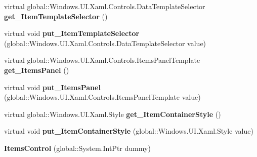\begin{DoxyCompactItemize}
\item 
\mbox{\label{class_windows_1_1_u_i_1_1_xaml_1_1_controls_1_1_items_control_a9959b8e62f370e00b7c5ba03c1735a6c}} 
virtual global\+::\+Windows.\+U\+I.\+Xaml.\+Controls.\+Data\+Template\+Selector {\bfseries get\+\_\+\+Item\+Template\+Selector} ()
\item 
\mbox{\label{class_windows_1_1_u_i_1_1_xaml_1_1_controls_1_1_items_control_aa9c0c0db76f9d77b78c08b022e500e90}} 
virtual void {\bfseries put\+\_\+\+Item\+Template\+Selector} (global\+::\+Windows.\+U\+I.\+Xaml.\+Controls.\+Data\+Template\+Selector value)
\item 
\mbox{\label{class_windows_1_1_u_i_1_1_xaml_1_1_controls_1_1_items_control_a54332e55a6fbe6987c21c07fe342a9e2}} 
virtual global\+::\+Windows.\+U\+I.\+Xaml.\+Controls.\+Items\+Panel\+Template {\bfseries get\+\_\+\+Items\+Panel} ()
\item 
\mbox{\label{class_windows_1_1_u_i_1_1_xaml_1_1_controls_1_1_items_control_affd7b155eec7e46ac2c935a6634d6d21}} 
virtual void {\bfseries put\+\_\+\+Items\+Panel} (global\+::\+Windows.\+U\+I.\+Xaml.\+Controls.\+Items\+Panel\+Template value)
\item 
\mbox{\label{class_windows_1_1_u_i_1_1_xaml_1_1_controls_1_1_items_control_ac8ecf557d2e90d25785dc40f5d1e3069}} 
virtual global\+::\+Windows.\+U\+I.\+Xaml.\+Style {\bfseries get\+\_\+\+Item\+Container\+Style} ()
\item 
\mbox{\label{class_windows_1_1_u_i_1_1_xaml_1_1_controls_1_1_items_control_a22e6b11c11e2306e3c13c1294b698d47}} 
virtual void {\bfseries put\+\_\+\+Item\+Container\+Style} (global\+::\+Windows.\+U\+I.\+Xaml.\+Style value)
\item 
\mbox{\label{class_windows_1_1_u_i_1_1_xaml_1_1_controls_1_1_items_control_a2a23be568a479e115892800d6b88b77a}} 
{\bfseries Items\+Control} (global\+::\+System.\+Int\+Ptr dummy)
\end{DoxyCompactItemize}
